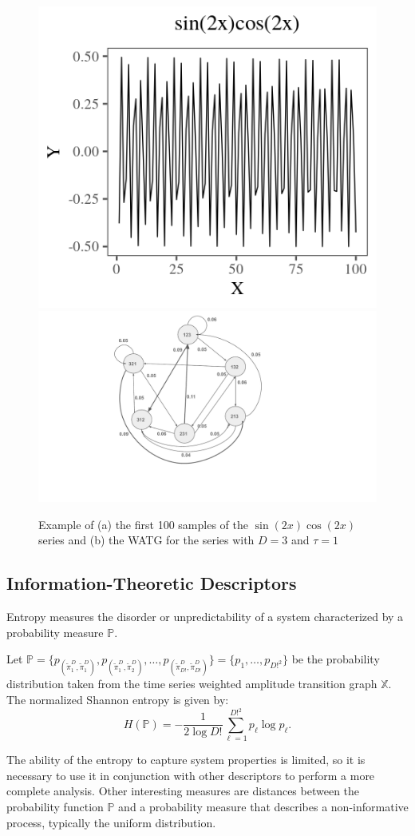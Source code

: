 \documentclass[paper=letter, fontsize=12pt]{article}
\begin{document}
\begin{figure}[hbt]
	\centering
	\includegraphics[width=.45\linewidth]{Figures/plotsincos.png}
	\includegraphics[width=.4\linewidth]{Figures/graph.pdf}
	\caption{Example of (a) the first 100 samples of the $\sin (2x)  \cos (2x)$ series and (b) the WATG for the series with $D = 3$ and $\tau = 1$}\label{fig:series}
\end{figure} 

\subsection{Information-Theoretic Descriptors}\label{HC}

Entropy measures the disorder or unpredictability of a system characterized by a probability measure $\mathbb{P}$.

Let $\mathbb{P} = \{p_{(\widetilde\pi^D_1, \widetilde\pi^D_1)}, p_{(\widetilde\pi^D_1, \widetilde\pi^D_2)}, \dots, p_{(\widetilde\pi^D_{D!}, \widetilde\pi^D_{D!})} \} = \{p_1,\dots,p_{D!^2}\}$ be the probability distribution taken from the time series weighted amplitude transition graph $\mathbb{X}$.
The normalized Shannon entropy is given by:	
\begin{equation}
H(\mathbb{P}) = -\frac1{2\log D!}\sum_{\ell=1}^{D!^2} p_{\ell} \log p_{\ell} .
\label{eq:Entropia}
\end{equation}

The ability of the entropy to capture system properties is limited, so it is necessary to use it in conjunction with other des\-criptors to perform a more complete analysis.
Other interesting measures are distances between the probability function $\mathbb{P}$ and a probability measure that describes a non-informative process, typically the uniform distribution.
\end{document}
